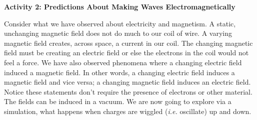 \textbf{Activity 2: Predictions About Making Waves Electromagnetically}

Consider what we have observed about electricity and magnetism.
A static, unchanging magnetic field does not do much to our coil of wire.
A varying magnetic field creates, across space, a current in our coil.
The changing magnetic field must be creating an electric field or else the electrons
in the coil would not feel a force.
We have also observed phenomena where a changing electric field induced a magnetic
field.
In other words, a changing electric field induces a magnetic field and vice versa;
a changing magnetic field induces an electric field.
Notice these statements don't require the presence of electrons or other material.
The fields can be induced in a vacuum.
We are now going to explore via a simulation, what happens when  charges are wiggled
(\textit{i.e.} oscillate) up and down.

